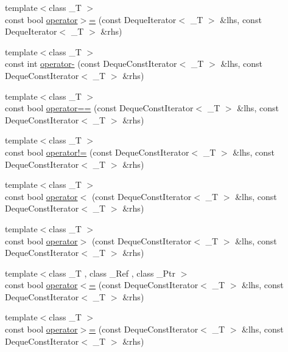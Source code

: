 \begin{DoxyCompactItemize}
{\footnotesize template$<$class \+\_\+T $>$ }\\const bool \hyperlink{namespaceprism_1_1containers_a991e08d63880a130ae76ff43a2af29af}{operator$>$=} (const Deque\+Iterator$<$ \+\_\+T $>$ \&lhs, const Deque\+Iterator$<$ \+\_\+T $>$ \&rhs)
\item 
{\footnotesize template$<$class \+\_\+T $>$ }\\const int \hyperlink{namespaceprism_1_1containers_a2160699645a4ae5dcf6695aec7af3065}{operator-\/} (const Deque\+Const\+Iterator$<$ \+\_\+T $>$ \&lhs, const Deque\+Const\+Iterator$<$ \+\_\+T $>$ \&rhs)
\item 
{\footnotesize template$<$class \+\_\+T $>$ }\\const bool \hyperlink{namespaceprism_1_1containers_a63c7f6ac798e1ef599acac6c3b4e5f45}{operator==} (const Deque\+Const\+Iterator$<$ \+\_\+T $>$ \&lhs, const Deque\+Const\+Iterator$<$ \+\_\+T $>$ \&rhs)
\item 
{\footnotesize template$<$class \+\_\+T $>$ }\\const bool \hyperlink{namespaceprism_1_1containers_a8f010b4cf1c5f7428c3378cd554a5446}{operator!=} (const Deque\+Const\+Iterator$<$ \+\_\+T $>$ \&lhs, const Deque\+Const\+Iterator$<$ \+\_\+T $>$ \&rhs)
\item 
{\footnotesize template$<$class \+\_\+T $>$ }\\const bool \hyperlink{namespaceprism_1_1containers_a5a06ea40224e51b14345103b2d536d7e}{operator$<$} (const Deque\+Const\+Iterator$<$ \+\_\+T $>$ \&lhs, const Deque\+Const\+Iterator$<$ \+\_\+T $>$ \&rhs)
\item 
{\footnotesize template$<$class \+\_\+T $>$ }\\const bool \hyperlink{namespaceprism_1_1containers_a9841f42f2958e4778876d94b06a36a7a}{operator$>$} (const Deque\+Const\+Iterator$<$ \+\_\+T $>$ \&lhs, const Deque\+Const\+Iterator$<$ \+\_\+T $>$ \&rhs)
\item 
{\footnotesize template$<$class \+\_\+T , class \+\_\+\+Ref , class \+\_\+\+Ptr $>$ }\\const bool \hyperlink{namespaceprism_1_1containers_a111194dc0384fbb2d11c1ccf92aedc41}{operator$<$=} (const Deque\+Const\+Iterator$<$ \+\_\+T $>$ \&lhs, const Deque\+Const\+Iterator$<$ \+\_\+T $>$ \&rhs)
\item 
{\footnotesize template$<$class \+\_\+T $>$ }\\const bool \hyperlink{namespaceprism_1_1containers_a26b87bb6c1c5befc4445a785a32e5185}{operator$>$=} (const Deque\+Const\+Iterator$<$ \+\_\+T $>$ \&lhs, const Deque\+Const\+Iterator$<$ \+\_\+T $>$ \&rhs)

\end{DoxyCompactItemize}
